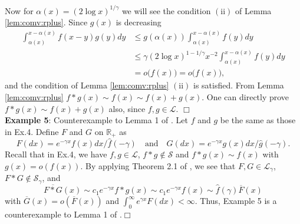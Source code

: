 \documentclass[12pt,leqno]{amsart}
\newtheorem{definition}[lemma]{Definition}
\newcommand{\R}{\mathbb{R}}
\newcommand{\wh}{\widehat}
\newcommand{\cals}{{\mathcal S}}
\newcommand{\call}{{\mathcal L}}
\newcommand{\1}{{\mathbf 1}}
\begin{document}
Now for $\alpha(x)=(2\log x)^{1/\gamma}$ we will see the condition $(\mathrm{ii})$ of 
Lemma \ref{lem:comv:rplus}. Since $g(x)$ is decreasing 
\begin{align*}
 \int_{\alpha(x)}^{x-\alpha(x)} f(x-y)g(y)dy %
&\le g(\alpha(x)) \int_{\alpha(x)}^{x-\alpha(x)}f(y)dy \\
&\le \gamma (2\log x)^{1-1/\gamma} x^{-2} \int_{\alpha(x)}^{x-\alpha(x)} f(y)dy \\
&= o\big(\underbar{f}(x)\big)=o\big(f(x)\big), 
\end{align*}
and the condition of Lemma \ref{lem:comv:rplus} $(\mathrm{ii})$ is satisfied. 
From Lemma \ref{lem:comv:rplus} $f\ast g(x)\sim f(x)\sim f(x)+g(x)$.
One can directly prove $f\ast g(x)\sim f(x)+g(x)$ also, since $f,g \in \call$. 
\hfill $\Box$\\ 

%



\noindent
{\bf Example 5}: Counterexample to Lemma 1 of \cite{Kluppelberg:Villasenor:1991}.
Let $f$ and $g$ be the same as those in Ex.4. Define $F$ and $G$ on $\R_+$ as
\[
F(dx)=e^{-\gamma x}f(x)dx/ \wh f(-\gamma) %
\quad \text{and}\quad G(dx)=e^{-\gamma x}g(x)dx/ \wh g(-\gamma). %
\]
Recall that in Ex.4, we have $f,g \in \call$, $f*g \notin \cals$ and $ f*g(x) \sim f(x)$ with $g(x) =o(f(x))$.
 By applying Theorem 2.1 of \cite{Watanabe:Yamamuro:2010},  we see that $F,G \in \call_\gamma$, $F*G \notin \cals_\gamma$, and
$$\overline{F*G}(x) \sim c_1e^{-\gamma x}f*g(x) \sim c_1 e^{-\gamma x}f(x)\sim  %
\wh f(\gamma)
\overline{F}(x)$$
with $\overline{G}(x)=o(\overline{F}(x))$ and $ \int_{0}^{\infty}e^{\gamma x}F(dx) < \infty$.
Thus, Example 5 is a counterexample to Lemma 1 of \cite{Kluppelberg:Villasenor:1991}.\hfill $\Box$ \\
\end{document}
